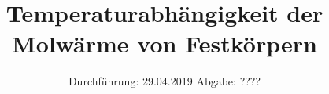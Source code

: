 

\subject{Versuch 47}
\title{Temperaturabhängigkeit der Molwärme von Festkörpern}
\date{%
  Durchführung: 29.04.2019
  \hspace{3em}
  Abgabe: ????
}



\maketitle
\thispagestyle{empty}
\tableofcontents
\newpage






\printbibliography{}


